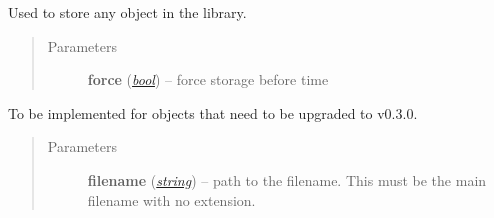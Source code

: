 \documentclass[a4paper,10pt,english]{sphinxmanual}
\begin{document}
\begin{fulllineitems}
\begin{fulllineitems}
\begin{quote}
\begin{description}
\end{description}\end{quote}

\end{fulllineitems}


\begin{fulllineitems}
\label{api-core:TensorToolbox.core.storable_object.store}
Used to store any object in the library.
\begin{quote}\begin{description}
\item[{Parameters}] \leavevmode
\textbf{force} (\href{http://docs.python.org/library/functions.html\#bool}{\emph{bool}}) -- force storage before time

\end{description}\end{quote}

\end{fulllineitems}


\begin{fulllineitems}
\label{api-core:TensorToolbox.core.storable_object.to_v_0_3_0}
To be implemented for objects that need to be upgraded to v0.3.0.
\begin{quote}\begin{description}
\item[{Parameters}] \leavevmode
\textbf{filename} (\href{http://docs.python.org/library/string.html\#module-string}{\emph{string}}) -- path to the filename. This must be the main filename with no extension.

\end{description}\end{quote}

\end{fulllineitems}


\end{fulllineitems}

\end{document}

